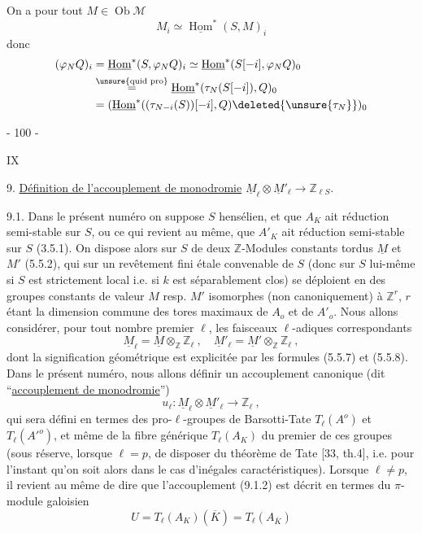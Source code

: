 On a pour tout $M\in\operatorname{Ob}\mathcal M$
\[ M_i\simeq\underline{\operatorname{Hom}}^*(S,M)_i \]
donc
\[
\begin{aligned}
(\varphi_NQ)_i&=\underline{\operatorname{Hom}}^*(S,\varphi_NQ)_i
\simeq\underline{\operatorname{Hom}}^*(S[-i],\varphi_NQ)_0\\
&\overset{\unsure{\text{quid pro}}}{=}\underline{\operatorname{Hom}}^*(\tau_N(S[-i]),Q)_0\\
&=(\underline{\operatorname{Hom}}^*((\tau_{N-i}(S))[-i],Q)\deleted{\unsure{\tau_N}})_0
\end{aligned}
\]

\begin{center}- 100 -\end{center}\hfill IX

9. \uline{Définition de l'accouplement de monodromie} $\underline M_\ell\otimes\underline M'_\ell\longrightarrow\mathbb Z_{\ell S}$.

9.1. Dans le présent numéro on suppose $S$ hensélien, et que $A_K$ ait réduction semi-stable sur $S$, ou ce qui revient au même, que $A'_K$ ait réduction semi-stable sur $S$ (3.5.1). On dispose alors sur $S$ de deux $\mathbb Z$-Modules constants tordus $\underline M$ et $M'$ (5.5.2), qui sur un revêtement fini étale convenable de $S$ (donc sur $S$ lui-même si $S$ est strictement local i.e. si $k$ est séparablement clos) se déploient en des groupes constants de valeur $M$ resp. $M'$ isomorphes (non canoniquement) à $\mathbb Z^r$, $r$ étant la dimension commune des tores maximaux de $A_o$ et de $A'_o$. Nous allons considérer, pour tout nombre premier $\ell$, les faisceaux $\ell$-adiques correspondants
\[
\tag{9.1.1}\underline M_\ell=\underline M\otimes_{\mathbb Z}\mathbb Z_\ell\ ,\quad
\underline M'_\ell=\underline M'\otimes_{\mathbb Z}\mathbb Z_\ell\ ,
\]
dont la signification géométrique est explicitée par les formules (5.5.7) et (5.5.8). Dans le présent numéro, nous allons définir un accouplement canonique (dit ``\uline{accouplement de monodromie}'')
\[
\tag{9.1.2}u_\ell:\underline M_\ell\otimes\underline M'_\ell\longrightarrow\mathbb Z_\ell\ ,
\]
qui sera défini en termes des pro-$\ell$-groupes de Barsotti-Tate $T_\ell(A^o)$ et $T_\ell(A'^o)$, et même de la fibre générique $T_\ell(A_K)$ du premier de ces groupes (sous réserve, lorsque $\ell=p$, de disposer du théorème de Tate [33, th.4], i.e. pour l'instant qu'on soit alors dans le cas d'inégales caractéristiques). Lorsque $\ell\ne p$, il revient au même de dire que l'accouplement (9.1.2) est décrit en termes du $\pi$-module galoisien
\[
\tag{9.1.3}U=T_\ell(A_K)(\overline K)=T_\ell(A_{\overline K})
\]

